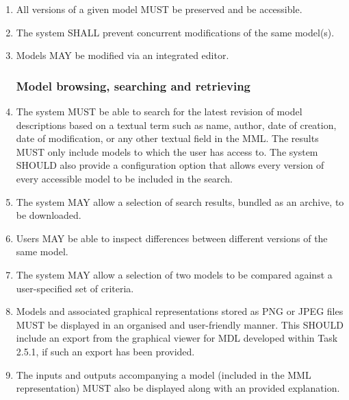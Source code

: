 \begin{enumerate}[1]
\item All versions of a given model MUST be preserved and be accessible.

\item The system SHALL prevent concurrent modifications of the same model(s).

\item Models MAY be modified via an integrated editor.

\subsubsection{Model browsing, searching and retrieving}
\item The system MUST be able to search for the latest revision of model descriptions based on a textual term such as name, author, date of creation, date of modification, or any other textual field in the MML. The results MUST only include models to which the user has access to. The system SHOULD also provide a configuration option that allows every version of every accessible model to be included in the search.


\item The system MAY allow a selection of search results, bundled as an archive, to be downloaded.

\item Users MAY be able to inspect differences between different versions of the same model.

\item The system MAY allow a selection of two models to be compared against a user-specified set of criteria.

\item Models and associated graphical representations stored as PNG or JPEG files MUST be displayed in an organised and user-friendly manner. This SHOULD include an export from the graphical viewer for MDL developed within Task 2.5.1, if such an export has been provided.

\item The inputs and outputs accompanying a model (included in the MML representation) MUST also be displayed along with an provided explanation.


\end{enumerate}
